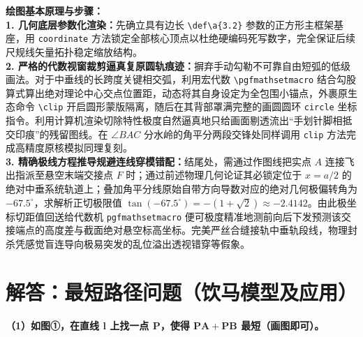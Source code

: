 {\small\color{blue!70!black}
\textbf{绘图基本原理与步骤：}\\
\textbf{1. 几何底层参数化渲染：}先确立具有边长 \texttt{\textbackslash def\textbackslash a\{3.2\}} 参数的正方形主框架基座，用 \texttt{coordinate} 方法锁定全部核心顶点以杜绝硬编码死写数字，完全保证后续尺规线矢量拓扑稳定缩放结构。\\
\textbf{2. 严格的代数视窗裁剪逼真复原圆轨痕迹：}摒弃手动勾勒不可靠自由短弧的低级画法。对于中垂线的长跨度关键相交弧，利用宏代数 \texttt{\textbackslash pgfmathsetmacro} 结合勾股算式算出绝对理论中心交点位置距，动态将其自身设定为全包围小锚点，外裹原生态命令 \texttt{\textbackslash clip} 开启圆形蒙版隔离，随后在其背部罩满完整的画圆圆环 \texttt{circle} 坐标指令。利用计算机渲染切除特性极度自然逼真地只给画面剔透流出“手划针脚相抵交印痕”的残留图线。在 $\angle BAC$ 分水岭的角平分两段交锋处同样调用 \texttt{clip} 方法完成高精度原核模拟同理复刻。\\
\textbf{3. 精确极线方程推导规避连线穿模错配：}结尾处，需通过作图线把实点 $A$ 连接飞出指派至悬空末端交接点 $F$ 时；通过前述物理几何论证其必锁定位于 $x=a/2$ 的绝对中垂系统轨道上；叠加角平分线原始自带方向导数对应的绝对几何极偏转角为 $-67.5^\circ$，求解析正切极限值 $\tan(-67.5^\circ) = -(1+\sqrt{2}) \approx -2.4142$。由此极坐标切距值回送给代数机 \texttt{pgfmathsetmacro} 便可极度精准地测前向后下发预测该交接端点的高度差与截面绝对悬空标高坐标。完美严丝合缝接轨中垂轨段线，物理封杀凭感觉盲连导向极易突发的乱位溢出透视错穿等假象。
}

\newpage

\newpage



\newpage

\section{解答：最短路径问题（饮马模型及应用）}

\vspace{0.6cm}

\textbf{（1）如图①，在直线 $\boldsymbol{l}$ 上找一点 $\boldsymbol{P}$，使得 $\boldsymbol{PA+PB}$ 最短（画图即可）。}

